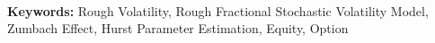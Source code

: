 


    \begin{titlepage}
        \maketitle
        
        \

        \

        \begin{abstract}
            
        \end{abstract}

        \

        \noindent
        \textbf{Keywords:} Rough Volatility, Rough Fractional Stochastic Volatility Model, Zumbach Effect, Hurst Parameter Estimation, Equity, Option
        \thispagestyle{empty}
    \end{titlepage}

    \tableofcontents
    \thispagestyle{empty}
    \clearpage

    
    \clearpage

    
    \clearpage

    
    \clearpage

    
    \clearpage

    
    \clearpage

    \printbibliography

